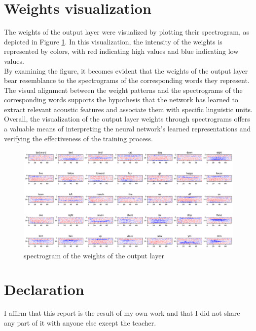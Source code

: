 \documentclass{class}
\begin{document}
\section{Weights visualization}
The weights of the output layer were visualized by plotting their spectrogram, as depicted in Figure \ref{fig-10}.
In this visualization, the intensity of the weights is represented by colors, with red indicating high values and blue indicating low values. \\
By examining the figure, it becomes evident that the weights of the output layer bear resemblance to the spectrograms of the corresponding words they represent.
The visual alignment between the weight patterns and the spectrograms of the corresponding words supports the hypothesis that
the network has learned to extract relevant acoustic features and associate them with specific linguistic units. \\
Overall, the visualization of the output layer weights through spectrograms offers a valuable means of interpreting the neural network's
learned representations and verifying the effectiveness of the training process.

\begin{figure}[H]
    \centering
    \includegraphics[width=\columnwidth]{images/spectrogram_weights.png}
    \caption{spectrogram of the weights of the output layer}
    \label{fig-10}
\end{figure}

\section{Declaration}
I affirm that this report is the result of my own work and that I did not share any part of it with anyone
else except the teacher.
\end{document}
